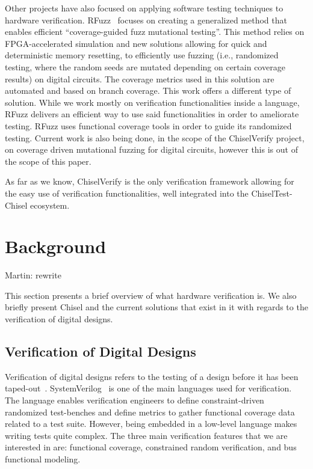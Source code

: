 \documentclass[conference]{IEEEtran}
\newcommand{\martin}[1]{{\color{blue} Martin: #1}}
\begin{document}
Other projects have also focused on applying software testing techniques to hardware verification. 
RFuzz~\cite{rfuzz2018} focuses on creating a generalized method that enables efficient ``coverage-guided fuzz mutational testing''. 
This method relies on FPGA-accelerated simulation and new solutions allowing for quick and deterministic memory resetting, to efficiently use fuzzing (i.e., randomized testing, where the random seeds are mutated depending on certain coverage results) on digital circuits. 
The coverage metrics used in this solution are automated and based on branch coverage. 
This work offers a different type of solution. 
While we work mostly on verification functionalities inside a language, RFuzz delivers an efficient way to use said functionalities in order to ameliorate testing. 
RFuzz uses functional coverage tools in order to guide its randomized testing. 
Current work is also being done, in the scope of the ChiselVerify project, on coverage driven mutational fuzzing for digital circuits, however this is out of the scope of this paper.


As far as we know, ChiselVerify is the only verification framework allowing for the easy use of verification functionalities, well integrated into the ChiselTest-Chisel ecosystem.



\section{Background}
\label{sec:background}

\martin{rewrite}


This section presents a brief overview of what hardware verification is. 
We also briefly present Chisel and the current solutions that exist in it with regards to the verification of digital designs.

\subsection{Verification of Digital Designs}
Verification of digital designs refers to the testing of a design before it has been taped-out~\cite{spear2008systemverilog}. 
SystemVerilog~\cite{SystemVerilog} is one of the main languages used for verification.
The language enables verification engineers to define constraint-driven randomized test-benches and define metrics to gather functional coverage data related to a test suite. 
However, being embedded in a low-level language makes writing tests quite complex. 
The three main verification features that we are interested in are: functional coverage, constrained random verification, and bus functional modeling.
\end{document}
